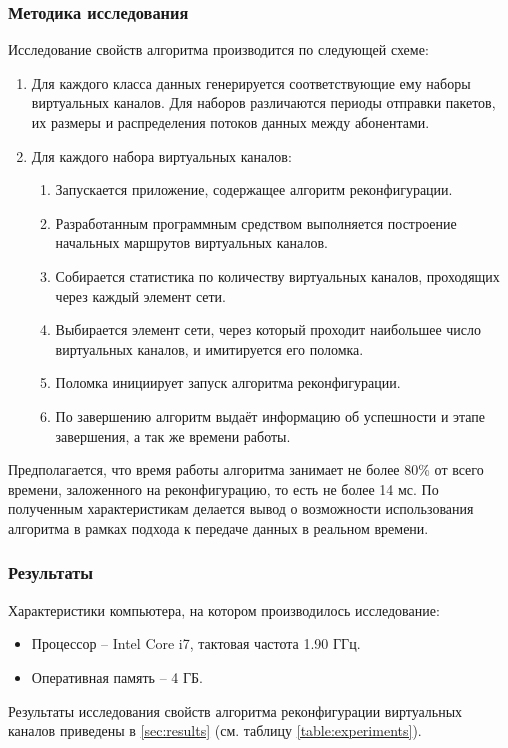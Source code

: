 \documentclass[12pt, a4paper]{article}
\begin{document}
\subsubsection{Методика исследования}
Исследование свойств алгоритма производится по следующей схеме:
\begin{enumerate}
	\item Для каждого класса данных генерируется соответствующие ему наборы виртуальных каналов. Для наборов различаются периоды отправки пакетов, их размеры и распределения потоков данных между абонентами.
	\item Для каждого набора виртуальных каналов:
	\begin{enumerate}
		\item Запускается приложение, содержащее алгоритм реконфигурации.
		\item Разработанным программным средством выполняется построение начальных маршрутов виртуальных каналов.
		\item Собирается статистика по количеству виртуальных каналов, проходящих через каждый элемент сети.
		\item Выбирается элемент сети, через который проходит наибольшее число виртуальных каналов, и имитируется его поломка.
		\item Поломка инициирует запуск алгоритма реконфигурации.
		\item По завершению алгоритм выдаёт информацию об успешности и этапе завершения, а так же времени работы.
	\end{enumerate}
\end{enumerate}

Предполагается, что время работы алгоритма занимает не более 80\% от всего времени, заложенного на реконфигурацию, то есть не более 14 мс. По полученным характеристикам делается вывод о возможности использования алгоритма в рамках подхода к передаче данных в реальном времени.
 
\subsubsection{Результаты}
Характеристики компьютера, на котором производилось исследование:
\begin{itemize}
	\item Процессор -- Intel Core i7, тактовая частота 1.90 ГГц.
	\item Оперативная память -- 4 ГБ.
\end{itemize}

Результаты исследования свойств алгоритма реконфигурации виртуальных каналов приведены в \ref{sec:results} (см. таблицу \ref{table:experiments}).
\end{document}

